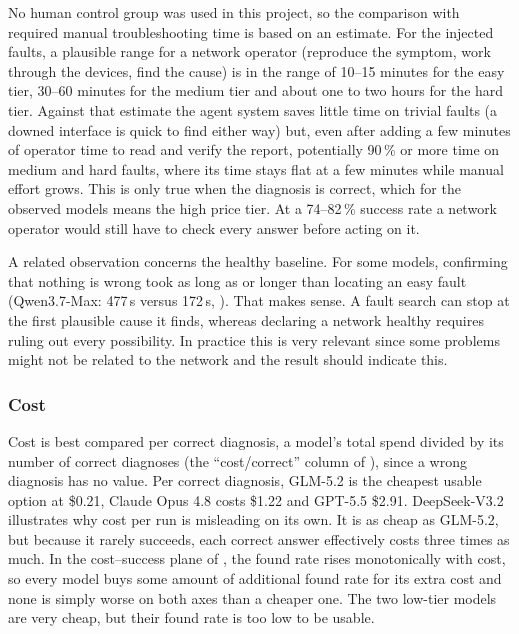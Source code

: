 No human control group was used in this project, so the comparison with required manual troubleshooting time
is based on an estimate. For the injected faults, a plausible range for a network
operator (reproduce the symptom, work through the devices, find the cause) is in the range
of 10--15 minutes for the easy tier, 30--60 minutes for the medium tier and about one to two hours for
the hard tier. Against that estimate the agent
system saves little time on trivial faults (a downed interface is quick to find either way) but,
even after adding a few minutes of operator time to read and verify the report,
potentially 90\,\% or more time on medium and hard faults, where its time stays
flat at a few minutes while manual effort grows. This is only true when the diagnosis is correct,
which for the observed models means the high price tier. At a 74--82\,\% success rate a network operator would still have to check every answer before acting on it.

A related observation concerns the healthy baseline. For some models, confirming that nothing
is wrong took as long as or longer than locating an easy fault (Qwen3.7-Max: 477\,s versus
172\,s, ). That makes sense. A fault search
can stop at the first plausible cause it finds, whereas declaring a network healthy requires ruling out every
possibility. In practice this is very relevant since some problems might not be related to the network and the result should indicate this.

\subsubsection{Cost}
\label{sec:discussion-cost}

Cost is best compared per correct diagnosis, a model's total spend divided by its number of
correct diagnoses (the ``cost/correct'' column of ), since a wrong
diagnosis has no value.
Per correct diagnosis, GLM-5.2 is the cheapest usable option at \$0.21, Claude Opus 4.8 costs
\$1.22 and GPT-5.5 \$2.91. DeepSeek-V3.2 illustrates why cost per run is misleading on its own.
It is as cheap as GLM-5.2, but because it rarely succeeds, each correct answer
effectively costs three times as much. In the cost--success plane of , the found rate rises monotonically
with cost, so every model buys some amount of additional found rate for its extra cost and none
is simply worse on both axes than a cheaper one. The two low-tier models are very cheap, but their
found rate is too low to be usable.

